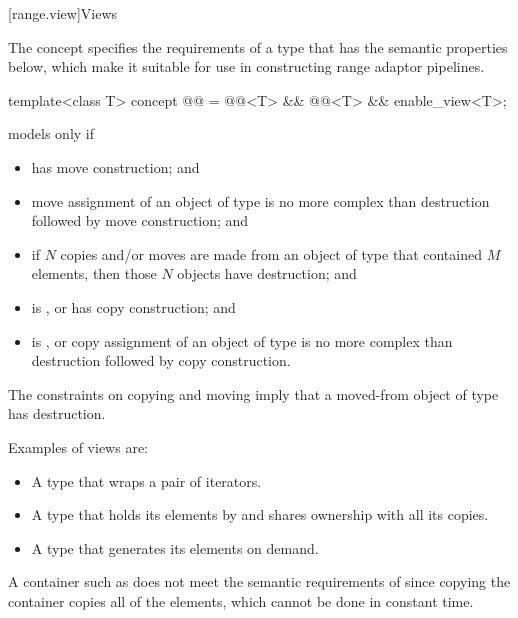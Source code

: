 [range.view]{Views}

\pnum
The  concept specifies the requirements of a  type
that has the semantic properties below,
which make it suitable for use in
constructing range adaptor pipelines.

\begin{itemdecl}
template<class T>
  concept @@ =
    @@<T> && @@<T> && enable_view<T>;
\end{itemdecl}

\begin{itemdescr}
\pnum
{} models  only if
\begin{itemize}
\item
{} has  move construction; and

\item
move assignment of an object of type 
is no more complex than destruction followed by move construction; and

\item
if $N$ copies and/or moves are made from an object of type 
that contained $M$ elements,
then those $N$ objects have  destruction; and

\item
{} is , or
 has  copy construction; and

\item
{} is , or
copy assignment of an object of type 
is no more complex than destruction followed by copy construction.
\end{itemize}

\pnum
\begin{note}
The constraints on copying and moving imply that
a moved-from object of type  has  destruction.
\end{note}

\pnum
\begin{example}
Examples of views are:
\begin{itemize}
\item A  type that wraps a pair of iterators.

\item A  type that holds its elements by 
and shares ownership with all its copies.

\item A  type that generates its elements on demand.
\end{itemize}

A container such as 
does not meet the semantic requirements of 
since copying the container copies all of the elements,
which cannot be done in constant time.
\end{example}
\end{itemdescr}

